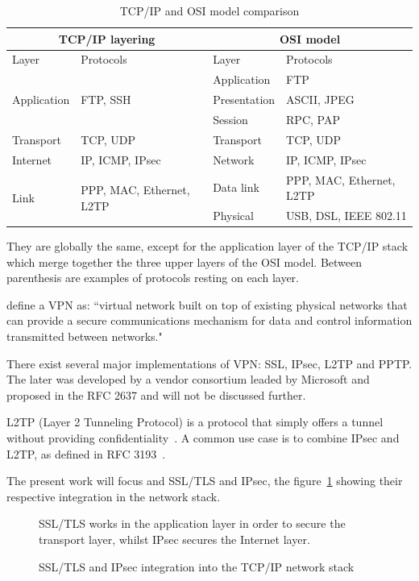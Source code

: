 \begin{table}[ht]
\center
\begin{tabularx}{\textwidth}{|l|l|l|X|} \hline
\multicolumn{2}{|c|}{TCP/IP layering} & \multicolumn{2}{c|}{OSI model} \\ \hline
Layer & Protocols & Layer & Protocols \\ \hline
\multirow{3}{*}{Application} & \multirow{3}{*}{FTP, SSH} & Application & FTP \\ \cline{3-4}
 & & Presentation & ASCII, JPEG \\ \cline{3-4}
 & & Session & RPC, PAP \\ \hline
Transport & TCP, UDP & Transport & TCP, UDP \\ \hline
Internet & IP, ICMP, IPsec & Network & IP, ICMP, IPsec \\ \hline
\multirow{2}{*}{Link} & \multirow{2}{*}{PPP, MAC, Ethernet, L2TP} & Data link & PPP, MAC, Ethernet, L2TP \\ \cline{3-4}
 & & Physical & USB, DSL, IEEE 802.11 \\ \hline
\end{tabularx}
\caption{TCP/IP and OSI model comparison}{They are globally the same, except for the application layer of the TCP/IP stack which merge together the three upper layers of the OSI model. Between parenthesis are examples of protocols resting on each layer.}
\label{tab:tcp-ip-stack}
\end{table}


\citet{Frankel:2005:SGI:2206289} define a VPN as: ``virtual network built on top of existing physical networks that can provide a
secure communications mechanism for data and control information transmitted between networks."

There exist several major implementations of VPN: SSL, IPsec, L2TP and PPTP.
The later was developed by a vendor consortium leaded by Microsoft and proposed in the RFC 2637 and will not be discussed further.

\noindent L2TP (Layer 2 Tunneling Protocol) is a protocol that simply offers a tunnel without providing confidentiality~\cite{rfc3931}.
A common use case is to combine IPsec and L2TP, as defined in RFC 3193~\cite{rfc3193}.\newline{}

The present work will focus and SSL/TLS and IPsec, the figure~\ref{fig:tls-ipsec} showing their respective integration in the network stack.

\begin{figure}[ht]
\center

\caption{SSL/TLS and IPsec integration into the TCP/IP network stack}{SSL/TLS works in the application layer in order to secure the transport layer, whilst IPsec secures the Internet layer.}
\label{fig:tls-ipsec}
\end{figure}

